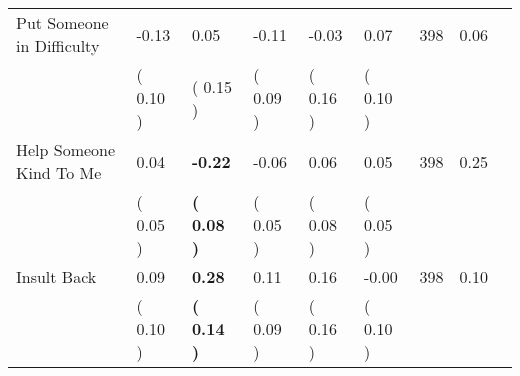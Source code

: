 \begin{tabular}{L{6.2cm} C{1.8cm} C{1.8cm} C{1.8cm} C{1.8cm} C{1.8cm} C{1.8cm} C{0.3cm} C{0.3cm}}
Put Someone in Difficulty &     -0.13 &      0.05 &     -0.11 &     -0.03 &      0.07  & 398 &       0.06 \\ 
 & (     0.10 ) & (     0.15 ) & (     0.09 ) & (     0.16 ) & (     0.10 )  & \\
Help Someone Kind To Me &      0.04 & \textbf{    -0.22} &     -0.06 &      0.06 &      0.05  & 398 &       0.25 \\ 
 & (     0.05 ) & \textbf{(     0.08 )} & (     0.05 ) & (     0.08 ) & (     0.05 )  & \\
Insult Back &      0.09 & \textbf{     0.28} &      0.11 &      0.16 &     -0.00  & 398 &       0.10 \\ 
 & (     0.10 ) & \textbf{(     0.14 )} & (     0.09 ) & (     0.16 ) & (     0.10 )  & \\
\bottomrule
\end{tabular}
